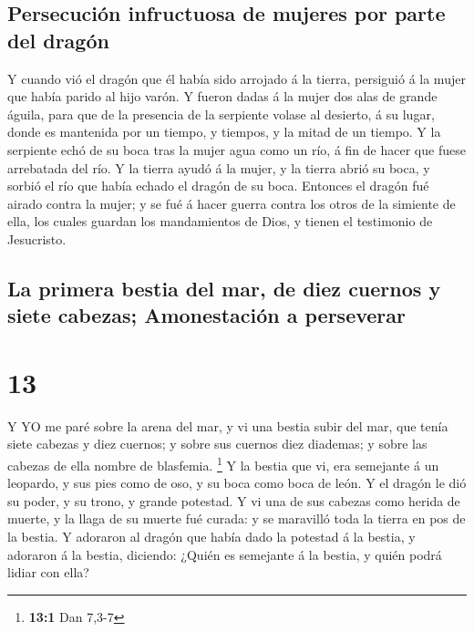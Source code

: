 \hypertarget{persecuciuxf3n-infructuosa-de-mujeres-por-parte-del-draguxf3n}{%
\subsection{Persecución infructuosa de mujeres por parte del
dragón}\label{persecuciuxf3n-infructuosa-de-mujeres-por-parte-del-draguxf3n}}

 Y cuando vió el dragón que él había sido arrojado á la
tierra, persiguió á la mujer que había parido al hijo varón.
 Y fueron dadas á la mujer dos alas de grande águila, para
que de la presencia de la serpiente volase al desierto, á su lugar,
donde es mantenida por un tiempo, y tiempos, y la mitad de un tiempo.
 Y la serpiente echó de su boca tras la mujer agua como un
río, á fin de hacer que fuese arrebatada del río.  Y la
tierra ayudó á la mujer, y la tierra abrió su boca, y sorbió el río que
había echado el dragón de su boca.  Entonces el dragón fué
airado contra la mujer; y se fué á hacer guerra contra los otros de la
simiente de ella, los cuales guardan los mandamientos de Dios, y tienen
el testimonio de Jesucristo.

\hypertarget{la-primera-bestia-del-mar-de-diez-cuernos-y-siete-cabezas-amonestaciuxf3n-a-perseverar}{%
\subsection{La primera bestia del mar, de diez cuernos y siete cabezas;
Amonestación a
perseverar}\label{la-primera-bestia-del-mar-de-diez-cuernos-y-siete-cabezas-amonestaciuxf3n-a-perseverar}}

\hypertarget{section-12}{%
\section{13}\label{section-12}}

 Y YO me paré sobre la arena del mar, y vi una bestia subir
del mar, que tenía siete cabezas y diez cuernos; y sobre sus cuernos
diez diademas; y sobre las cabezas de ella nombre de blasfemia.
\footnote{\textbf{13:1} Dan 7,3-7}  Y la bestia que vi, era
semejante á un leopardo, y sus pies como de oso, y su boca como boca de
león. Y el dragón le dió su poder, y su trono, y grande potestad.
 Y vi una de sus cabezas como herida de muerte, y la llaga
de su muerte fué curada: y se maravilló toda la tierra en pos de la
bestia.  Y adoraron al dragón que había dado la potestad á
la bestia, y adoraron á la bestia, diciendo: ¿Quién es semejante á la
bestia, y quién podrá lidiar con ella?


